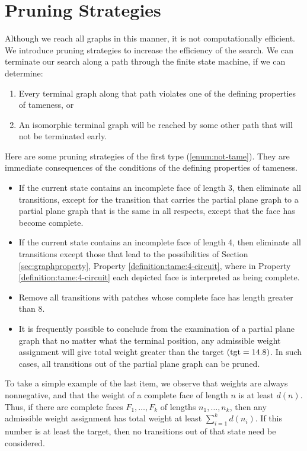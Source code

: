 \section{Pruning Strategies}

Although we reach all graphs in this manner, it is not
computationally efficient. We introduce pruning strategies to
increase the efficiency of the search. We can terminate our search
along a path through the finite state machine, if we can
determine:
\begin{enumerate}
  \item Every terminal graph
along that path violates one of the defining properties of
tameness, or
    \label{enum:not-tame}
  \item An isomorphic terminal graph will be reached by
some other path that will not be terminated early.
    \label{enum:branch}
\end{enumerate}

Here are some pruning strategies of the first type
(\ref{enum:not-tame}). They are immediate consequences of the
conditions of the defining properties of tameness.

\begin{itemize}
  \item If the current state contains an incomplete face of length 3,
    then eliminate all transitions, except for the transition
    that carries the partial plane graph to a partial plane graph that
    is the same in all respects, except that the face has
    become complete.
  \item If the current state contains an incomplete face of length 4,
    then eliminate all transitions except those that lead to
    the possibilities of Section \ref{sec:graphproperty},
    Property \ref{definition:tame:4-circuit},
    where in Property \ref{definition:tame:4-circuit}
     each depicted face is interpreted
    as being complete.
  \item Remove all transitions with
    patches whose complete face has length greater than
    $8$.
  \item It is frequently possible to conclude from the examination of a partial
    plane graph that no matter what the terminal position,
    any admissible weight assignment will give total weight greater than
    the target $({\operatorname{tgt}}=14.8)$.  In such cases, all transitions out of the
    partial plane graph can be pruned.
\end{itemize}

    To take a simple example of the last item, we observe that weights are always
    nonnegative, and that the weight of a complete face of
    length $n$ is at least $d(n)$.  Thus, if there are complete
    faces $F_1,\ldots,F_k$ of lengths $n_1,\ldots,n_k$, then
     any admissible weight assignment has total weight at least
    $\sum_{i=1}^k d(n_i)$.  If this number is at least the
    target, then no transitions out of that state need be considered.

